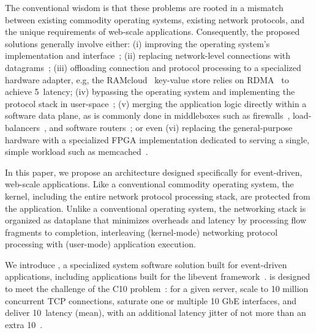 The conventional wisdom is that these problems are rooted in a
mismatch between existing commodity operating systems, existing
network protocols, and the unique requirements of web-scale
applications.  Consequently, the proposed solutions generally involve
either: 
(i) improving the operating system's implementation and
interface~\cite{DBLP:conf/eurosys/PesterevSZM12,han2012megapipe}; 
(ii) replacing network-level connections with
datagrams~\cite{nishtala2013scaling}; 
(iii) offloading connection and protocol processing to a specialized hardware adapter, e.g, the
RAMcloud~\cite{DBLP:conf/sosp/OngaroRSOR11} key-value store relies on
RDMA~\cite{rdma-user-manual} to achieve 5~\microsecond latency; (iv)
bypassing the operating system and implementing the protocol stack in
user-space~\cite{jeong2014mtcp}; (v) merging the application logic
directly within a software data plane, as is commonly done in
middleboxes such as firewalls~\cite{missing},
load-balancers~\cite{missing}, and software
routers~\cite{DBLP:journals/tocs/KohlerMCJK00,DBLP:conf/sosp/DobrescuEACFIKMR09};
or even (vi) replacing the general-purpose hardware with a specialized
FPGA implementation dedicated to serving a single, simple workload
such as memcached~\cite{DBLP:conf/fpga/ChalamalasettiLWARM13}.

In this paper, we propose an architecture designed specifically for
event-driven, web-scale applications.  Like a conventional commodity
operating system, the kernel, including the entire network protocol
processing stack, are protected from the application.  Unlike a
conventional operating system, the networking stack is organized as
dataplane that minimizes overheads and latency by processing flow
fragments to completion, interleaving (kernel-mode) networking
protocol processing with (user-mode) application execution.

We introduce \ix, a specialized system software solution built for
event-driven applications, including applications built for the
libevent framework~\cite{provos2003libevent}.  \ix is designed to meet the
challenge of the C10 problem~\cite{theC10Mproblem}: for a given
server, scale to 10 million concurrent TCP connections, saturate one
or multiple 10 GbE interfaces, and deliver 10~\microsecond latency
(mean), with an additional latency jitter of not more than an extra
10~\microsecond.


